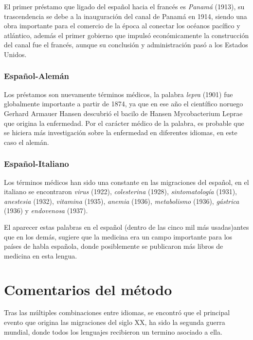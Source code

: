 El primer préstamo que ligado del español hacia el francés es \textit{Panamá} (1913), su trascendencia se debe a la inauguración del canal de Panamá en 1914, siendo una obra importante para el comercio de la época al conectar los océanos pacífico y atlántico, además el primer gobierno que impulsó económicamente la construcción del canal fue el francés, aunque su conclusión y administración pasó a los Estados Unidos.  




\subsubsection*{Español-Alemán}


Los préstamos son nuevamente términos médicos, la palabra \textit{lepra} (1901) fue globalmente importante a partir de 1874,  ya que en ese año el científico noruego Gerhard Armauer Hansen descubrió el bacilo de Hansen Mycobacterium Leprae \cite{lepra} que origina la enfermedad. Por el carácter médico de la palabra, es probable que se hiciera más investigación sobre la enfermedad en diferentes idiomas, en este caso el alemán. 


\subsubsection*{Español-Italiano}%

Los términos médicos han sido una constante en las migraciones del español, en el italiano se encontraron \textit{virus} (1922), \textit{colesterina} (1928),  \textit{sintomatología} (1931), \textit{anestesia} (1932), \textit{vitamina} (1935), \textit{anemia} (1936), \textit{metabolismo} (1936),  \textit{gástrica} (1936)  y \textit{endovenosa} (1937).  

El aparecer estas palabras en el español (dentro de las cinco mil más usadas)antes que en los demás,  sugiere que la medicina era un campo importante para los países de habla española, donde posiblemente se publicaron más libros de medicina en esta lengua. 






\section{Comentarios del método}%



Tras las múltiples combinaciones entre idiomas, se  encontró que el principal evento que origina las migraciones del siglo XX, ha sido la segunda guerra mundial, donde todos los lenguajes recibieron un termino asociado a ella.

